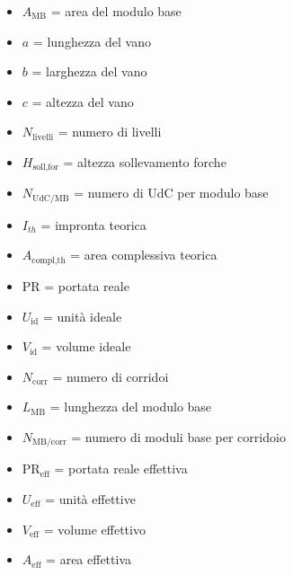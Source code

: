 \documentclass[11pt]{article}
\begin{document}
\begin{itemize}
    \item $A_\text{MB}$ = area del modulo base
    \item $a$ = lunghezza del vano
    \item $b$ = larghezza del vano
    \item $c$ = altezza del vano

    \item $N_\text{livelli}$ = numero di livelli
    \item $H_\text{soll,for}$ = altezza sollevamento forche

    \item $N_\text{UdC/MB}$ = numero di UdC per modulo base
    
    \item $I_{th}$ = impronta teorica

    \item $A_\text{compl,th}$ = area complessiva teorica
    \item $\text{PR}$ = portata reale
    
    \item $U_\text{id}$ = unità ideale

    \item $V_\text{id}$ = volume ideale

    \item $N_\text{corr}$ = numero di corridoi
    \item $L_\text{MB}$ = lunghezza del modulo base
    
    \item $N_\text{MB/corr}$ = numero di moduli base per corridoio
    
    \item $\text{PR}_\text{eff}$ = portata reale effettiva

    \item $U_\text{eff}$ = unità effettive
    \item $V_\text{eff}$ = volume effettivo
    \item $A_\text{eff}$ = area effettiva
\end{itemize}
\end{document}
